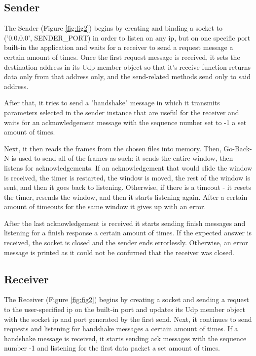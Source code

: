 \documentclass[12pt]{article}
\begin{document}
\subsection{Sender}

The Sender (Figure \ref{fig:fig2}) begins by creating and binding a socket to ('0.0.0.0', SENDER\_PORT) in order to listen on any ip, but on one specific port built-in the application and waits for a receiver to send a request message a certain amount of times. Once the first request message is received, it sets the destination address in its Udp member object so that it's receive function returns data only from that address only, and the send-related methods send only to said address.

After that, it tries to send a "handshake" message in which it transmits parameters selected in the sender instance that are useful for the receiver and waits for an acknowledgement message with the sequence number set to -1 a set amount of times.

Next, it then reads the frames from the chosen files into memory. Then, Go-Back-N is used to send all of the frames as such: it sends the entire window, then listens for acknowledgements. If an acknowledgement that would slide the window is received, the timer is restarted, the window is moved, the rest of the window is sent, and then it goes back to listening. Otherwise, if there is a timeout - it resets the timer, resends the window, and then it starts listening again. After a certain amount of timeouts for the same window it gives up with an error.

After the last acknowledgement is received it starts sending finish messages and listening for a finish response a certain amount of times. If the expected answer is received, the socket is closed and the sender ends errorlessly. Otherwise, an error message is printed as it could not be confirmed that the receiver was closed.

\subsection{Receiver}

The Receiver (Figure \ref{fig:fig2}) begins by creating a socket and sending a request to the user-specified ip on the built-in port and updates its Udp member object with the socket ip and port generated by the first send. Next, it continues to send requests and listening for handshake messages a certain amount of times. If a handshake message is received, it starts sending ack messages with the sequence number -1 and listening for the first data packet a set amount of times.
\end{document}
